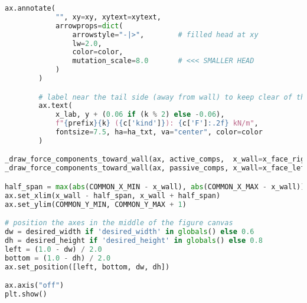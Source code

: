 \begin{lstlisting}[language=Python]
        ax.annotate(
            "", xy=xy, xytext=xytext,
            arrowprops=dict(
                arrowstyle="-|>",        # filled head at xy
                lw=2.0,
                color=color,
                mutation_scale=8.0       # <<< SMALLER HEAD
            )
        )

        # label near the tail side (away from wall) to keep clear of the head/PoA
        ax.text(
            x_lab, y + (0.06 if (k % 2) else -0.06),
            f"{prefix}{k} ({c['kind']}): {c['F']:.2f} kN/m",
            fontsize=7.5, ha=ha_txt, va="center", color=color
        )

_draw_force_components_toward_wall(ax, active_comps,  x_wall=x_face_right, to_wall_sign=-1, color="red",  prefix="Fₐ")
_draw_force_components_toward_wall(ax, passive_comps, x_wall=x_face_left,  to_wall_sign=+1, color="navy", prefix="Fₚ")

half_span = max(abs(COMMON_X_MIN - x_wall), abs(COMMON_X_MAX - x_wall))
ax.set_xlim(x_wall - half_span, x_wall + half_span)
ax.set_ylim(COMMON_Y_MIN, COMMON_Y_MAX + 1)

# position the axes in the middle of the figure canvas
dw = desired_width if 'desired_width' in globals() else 0.6
dh = desired_height if 'desired_height' in globals() else 0.8
left = (1.0 - dw) / 2.0
bottom = (1.0 - dh) / 2.0
ax.set_position([left, bottom, dw, dh])

ax.axis("off")
plt.show()
\end{lstlisting}




